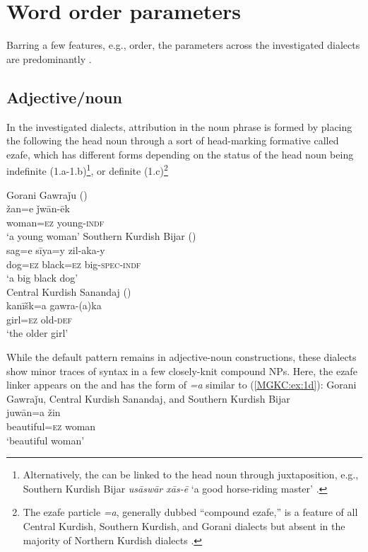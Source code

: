 \documentclass[output=paper,colorlinks,citecolor=brown]{langscibook}
\begin{document}
\begin{sloppypar}
\section{Word order parameters} \label{sec: param}
Barring a few features, e.g.,  order, the  parameters across the investigated dialects are predominantly . 

\subsection{Adjective/noun}
In the investigated dialects, attribution in the noun phrase is formed by placing the  following the head noun through a sort of head-marking formative called ezafe, which has different forms depending on the status of the head noun being indefinite (1.a-1.b)\footnote{Alternatively, the  can be linked to the head noun through juxtaposition, e.g., Southern Kurdish Bijar \textit{usāswār xās-ē} `a good horse-riding master' \citep[D, 0285]{mohammadirad_Bijar_Kurdish_2022}.}, or definite (1.c)\footnote{The ezafe particle \textit{=a}, generally dubbed ``compound ezafe,'' is a feature of all Central Kurdish, Southern Kurdish, and Gorani dialects but absent in the majority of Northern Kurdish dialects \citep[cf.][83]{mackenzie_kurdish_1962}.}

\ea
\ea\label{MGKC:ex:1a}
Gorani Gawraǰu (\citealt[E, 0770]{mohammadirad_gorani_2022}) \\
\gll žan=e ǰwān-ēk \\
woman\textsc{=ez} young\textsc{-indf} \\
\glt `a young woman'
\ex\label{MGKC:ex:1b}
Southern Kurdish Bijar (\citealt[B, 0166]{mohammadirad_Bijar_Kurdish_2022}) \\
\gll sag=e sīya=y zil-aka-y \\
dog\textsc{=ez} black\textsc{=ez} big\textsc{-spec-indf} \\
\glt `a big black dog' \\
\ex\label{MGKC:ex:1c}
Central Kurdish Sanandaj (\citealt[A, 0065]{mohammadirad_Sanandaj_Kurdish_2022}) \\
\gll kanīšk=a gawra-(a)ka \\
girl\textsc{=ez} old-\textsc{def} \\
\glt `the older girl' \label{MGKC:ex:1d}
\z
\z 

While the default pattern remains  in adjective-noun constructions, these dialects show minor traces of  syntax in a few closely-knit compound NPs. Here, the ezafe linker appears on the  and has the form of \textit{=a} similar to (\ref{MGKC:ex:1d}):
\ea
Gorani Gawraǰu, Central Kurdish Sanandaj, and Southern Kurdish Bijar  \\
\gll juwān=a žin \\
beautiful\textsc{=ez} woman \\
\glt `beautiful woman' 
\z 


\end{sloppypar}
\end{document}
